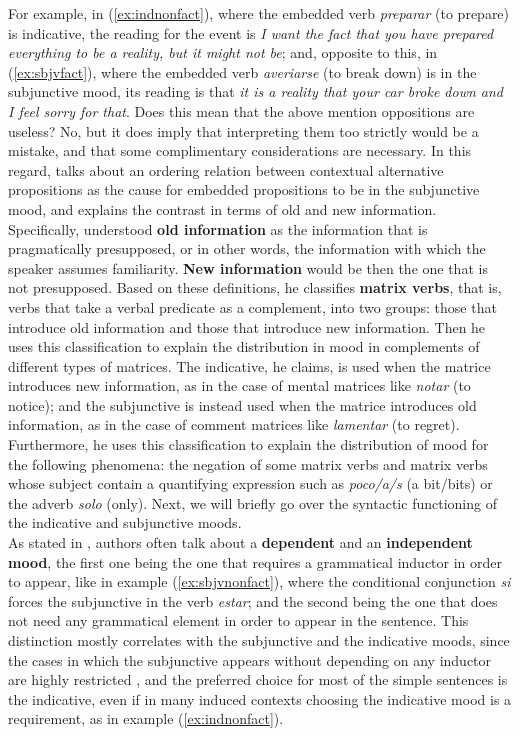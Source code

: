 For example, in (\ref{ex:indnonfact}), where the embedded verb \textit{preparar} (to prepare) is indicative, the reading for the event is \textit{I want the fact that you have prepared everything to be a reality, but it might not be}; and, opposite to this, in (\ref{ex:sbjvfact}), where the embedded verb \textit{averiarse} (to break down) is in the subjunctive mood, its reading is that \textit{it is a reality that your car broke down and I feel sorry for that}. Does this mean that the above mention oppositions are useless? No, but it does imply that interpreting them too strictly would be a mistake, and that some complimentary considerations are necessary. In this regard, \citet{villalta2008mood} talks about an ordering relation between contextual alternative propositions as the cause for embedded propositions to be in the subjunctive mood, and \citet{mejias1998pragmatic} explains the contrast in terms of old and new information.\\ 

Specifically, \citet{mejias1998pragmatic} understood \textbf{old information} as the information that is pragmatically presupposed, or in other words, the information with which the speaker assumes familiarity. \textbf{New information} would be then the one that is not presupposed. Based on these definitions, he classifies \textbf{matrix verbs}, that is, verbs that take a verbal predicate as a complement, into two groups: those that introduce old information and those that introduce new information. Then he uses this classification to explain the distribution in mood in complements of different types of matrices. The indicative, he claims, is used when the matrice introduces new information, as in the case of mental matrices like \textit{notar} (to notice); and the subjunctive is instead used when the matrice introduces old information, as in the case of comment matrices like  \textit{lamentar} (to regret). Furthermore, he uses this classification to explain the distribution of mood for the following phenomena: the negation of some matrix verbs and matrix verbs whose subject contain a quantifying expression such as \textit{poco/a/s} (a bit/bits) or the adverb \textit{solo} (only). Next, we will briefly go over the syntactic functioning of the indicative and subjunctive moods.\\

As stated in \citet{espanola2010nueva}, authors often talk about a \textbf{dependent} and an \textbf{independent mood}, the first one being the one that requires a grammatical inductor in order to appear, like in example (\ref{ex:sbjvnonfact}), where the conditional conjunction \textit{si} forces the subjunctive in the verb \textit{estar}; and the second being the one that does not need any grammatical element in order to appear in the sentence. This distinction mostly correlates with the subjunctive and the indicative moods, since the cases in which the subjunctive appears without depending on any inductor are highly restricted \citep{espanola2010nueva}, and the preferred choice for most of the simple sentences is the indicative, even if in many induced contexts choosing the indicative mood is a requirement, as in example (\ref{ex:indnonfact}).\\

